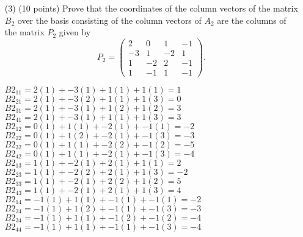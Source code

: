 \documentclass[12pt]{article}
\begin{document}
\begin{itemize}
\item[(3)](10 points)
Prove that the coordinates of the column vectors of the matrix $B_2$
over the basis consisting of the column vectors of $A_2$ 
are the columns of the matrix $P_2$ given by
\[
P_2 = 
\begin{pmatrix}
2 & 0 & 1 & -1\\
-3 & 1 & -2 & 1 \\
1 & -2 & 2 & -1 \\
1 & -1 & 1 & -1
\end{pmatrix} .
\]

$B2_{11}=2(1)+-3(1)+1(1)+1(1)=1$
\newline $B2_{21}=2(1)+-3(2)+1(1)+1(3)=0$
\newline $B2_{31}=2(1)+-3(1)+1(2)+1(2)=3$
\newline $B2_{41}=2(1)+-3(1)+1(1)+1(3)=3$
\newline $B2_{12}=0(1)+1(1)+-2(1)+-1(1)=-2$
\newline $B2_{22}=0(1)+1(2)+-2(1)+-1(3)=-3$
\newline $B2_{32}=0(1)+1(1)+-2(2)+-1(2)=-5$
\newline $B2_{42}=0(1)+1(1)+-2(1)+-1(3)=-4$
\newline $B2_{13}=1(1)+-2(1)+2(1)+1(1)=2$
\newline $B2_{23}=1(1)+-2(2)+2(1)+1(3)=-2$
\newline $B2_{33}=1(1)+-2(1)+2(2)+1(2)=5$
\newline $B2_{43}=1(1)+-2(1)+2(1)+1(3)=4$
\newline $B2_{14}=-1(1)+1(1)+-1(1)+-1(1)=-2$
\newline $B2_{24}=-1(1)+1(2)+-1(1)+-1(3)=-3$
\newline $B2_{34}=-1(1)+1(1)+-1(2)+-1(2)=-4$
\newline $B2_{44}=-1(1)+1(1)+-1(1)+-1(3)=-4$




\end{itemize}
\end{document}
